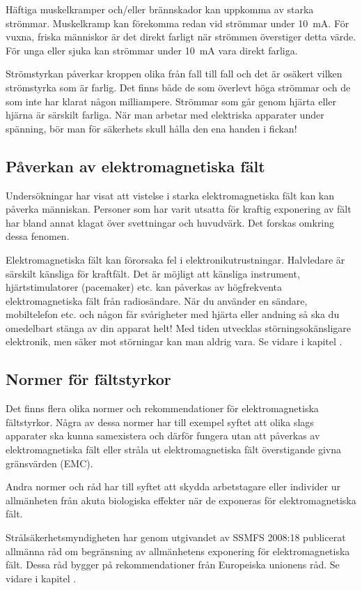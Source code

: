 \vspace{1ex}
Häftiga muskelkramper och/eller brännskador kan uppkomma av starka strömmar.
Muskelkramp kan förekomma redan vid strömmar under \qty{10}{\milli\ampere}.
För vuxna, friska människor är det direkt farligt när strömmen överstiger
detta värde.
För unga eller sjuka kan strömmar under \qty{10}{\milli\ampere} vara direkt
farliga.

Strömstyrkan påverkar kroppen olika från fall till fall och det är osäkert
vilken strömstyrka som är farlig.
Det finns både de som överlevt höga strömmar och de som inte har klarat någon
milliampere.
Strömmar som går genom hjärta eller hjärna är särskilt farliga.
När man arbetar med elektriska apparater under spänning, bör man för säkerhets
skull hålla den ena handen i fickan!

\subsection{Påverkan av elektromagnetiska fält}

Undersökningar har visat att vistelse i starka elektromagnetiska fält
kan kan påverka människan.
Personer som har varit utsatta för kraftig exponering av fält har bland annat
klagat över svettningar och huvudvärk.
Det forskas omkring dessa fenomen.

Elektromagnetiska fält kan förorsaka fel i elektronikutrustningar.
Halvledare är särskilt känsliga för kraftfält.
Det är möjligt att känsliga instrument, hjärtstimulatorer (pacemaker) etc. kan
påverkas av högfrekventa elektromagnetiska fält från radiosändare.
När du använder en sändare, mobiltelefon etc. och någon får svårigheter med
hjärta eller andning så ska du omedelbart stänga av din apparat helt!
Med tiden utvecklas störningsokänsligare elektronik, men säker mot störningar
kan man aldrig vara. Se vidare i kapitel .

\subsection{Normer för fältstyrkor}

Det finns flera olika normer och rekommendationer för elektromagnetiska
fältstyrkor. Några av dessa normer har till exempel syftet att olika slags
apparater ska kunna samexistera och därför fungera utan att påverkas av
elektromagnetiska fält eller stråla ut elektromagnetiska fält överstigande
givna gränsvärden (EMC).

Andra normer och råd har till syftet att skydda arbetstagare eller individer
ur allmänheten från akuta biologiska effekter när de exponeras för
elektromagnetiska fält.

Strålsäkerhetsmyndigheten har genom utgivandet av SSMFS 2008:18 publicerat
allmänna råd om begränsning av allmänhetens exponering för elektromagnetiska
fält.
Dessa råd bygger på rekommendationer från Europeiska unionens råd.
Se vidare i kapitel .
